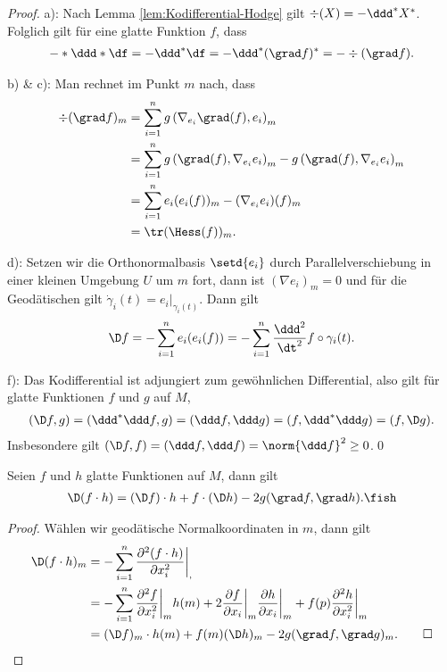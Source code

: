 \documentclass[%
	paper=a5,%
	fleqn,%
	DIV=18,%
	BCOR=0mm,
	fontsize=11pt,
	titlepage=false,%
	bibliography=totoc,
	DIV=18,%
	twoside=true,
	pdftitle=Riemannsche Geometrie,
	pdfauthor=Uwe Semmelmann,
	numbers=noendperiod]%
	{scrbook}
\begin{document}
\begin{proof}
a): Nach Lemma \ref{lem:Kodifferential-Hodge} gilt $\div(X) = -\ddd^*X^*$. Folglich gilt für eine glatte Funktion $f$, dass
\begin{align*}
-*\ddd * \df = -\ddd^* \df = -\ddd^* (\grad f)^* = -\div(\grad f).
\end{align*}

b) \& c): Man rechnet im Punkt $m$ nach, dass
\begin{align*}
\div(\grad f)_{m} &= \sum_{i=1}^n g\left(\nabla_{e_{i}}\grad(f),e_{i}\right)_{m}\\
&= \sum_{i=1}^n g\left(\grad(f),\nabla_{e_{i}}e_{i}\right)_{m} - g\left(\grad(f),\nabla_{e_{i}}e_{i}\right)_{m}\\
&= \sum_{i=1}^n e_{i}(e_{i}(f))_{m} - (\nabla_{e_{i}}e_{i})(f)_{m}\\
&= \tr(\Hess(f))_{m}.
\end{align*} 

d): Setzen wir die Orthonormalbasis $\setd{e_{i}}$ durch Parallelverschiebung in einer kleinen Umgebung $U$ um $m$ fort, dann ist $(\nabla e_{i})_{m} = 0$ und für die Geodätischen gilt $\dot{\gamma}_{i}(t) = e_{i}\big|_{\gamma_{i}(t)}$. Dann gilt
\begin{align*}
\D f = - \sum_{i=1}^n e_{i}(e_{i}(f)) =  - \sum_{i=1}^n \frac{\ddd^2}{\dt^2} f\circ\gamma_{i}(t).
\end{align*}

f): Das Kodifferential ist adjungiert zum gewöhnlichen Differential, also gilt für glatte Funktionen $f$ und $g$ auf $M$,
\begin{align*}
(\D f,g) = (\ddd^* \ddd f,g) = (\ddd f,\ddd g) = (f,\ddd^*\ddd g) = (f,\D g).
\end{align*}
Insbesondere gilt $(\D f,f) = (\ddd f,\ddd f) = \norm{\ddd f}^2 \ge 0$.\qed
\end{proof}

\begin{prop}[Produktregel]
Seien $f$ und $h$ glatte Funktionen auf $M$, dann gilt
\begin{align*}
\D(f\cdot h) = (\D f)\cdot h + f\cdot (\D h) - 2g(\grad f,\grad h).\fish
\end{align*}
\end{prop}
\begin{proof}
Wählen wir geodätische Normalkoordinaten in $m$, dann gilt
\begin{align*}
\D (f\cdot h)_{m} &= - \sum_{i=1}^n \frac{\partial^2 (f\cdot h)}{\partial x_{i}^2}\bigg|_{,}\\
& = - \sum_{i=1}^n 
\frac{\partial^2 f}{\partial x_{i}^2}\bigg|_{m} h(m)
+
2\frac{\partial f}{\partial x_{i}}\bigg|_{m}
\frac{\partial h}{\partial x_{i}}\bigg|_{m}
+
f(p)\frac{\partial^2 h}{\partial x_{i}^2}\bigg|_{m}\\
&= (\D f)_{m}\cdot h(m)
+ f(m)(\D h)_{m} - 2g(\grad f,\grad g)_{m}.\qed
\end{align*}
\end{proof}
\end{document}
